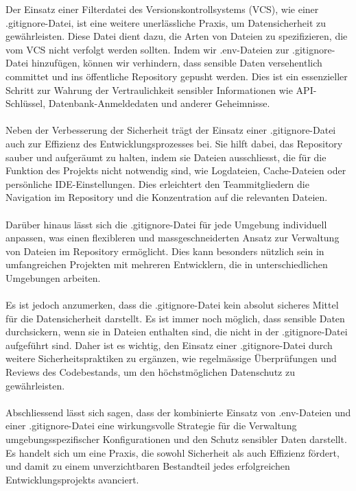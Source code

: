 Der Einsatz einer Filterdatei des Versionskontrollsystems (VCS), wie einer .gitignore-Datei, ist eine weitere unerlässliche Praxis, um Datensicherheit zu gewährleisten. Diese Datei dient dazu, die Arten von Dateien zu spezifizieren, die vom VCS nicht verfolgt werden sollten. Indem wir .env-Dateien zur .gitignore-Datei hinzufügen, können wir verhindern, dass sensible Daten versehentlich committet und ins öffentliche Repository gepusht werden. Dies ist ein essenzieller Schritt zur Wahrung der Vertraulichkeit sensibler Informationen wie API-Schlüssel, Datenbank-Anmeldedaten und anderer Geheimnisse.\\\\
Neben der Verbesserung der Sicherheit trägt der Einsatz einer .gitignore-Datei auch zur Effizienz des Entwicklungsprozesses bei. Sie hilft dabei, das Repository sauber und aufgeräumt zu halten, indem sie Dateien ausschliesst, die für die Funktion des Projekts nicht notwendig sind, wie Logdateien, Cache-Dateien oder persönliche IDE-Einstellungen. Dies erleichtert den Teammitgliedern die Navigation im Repository und die Konzentration auf die relevanten Dateien.\\\\
Darüber hinaus lässt sich die .gitignore-Datei für jede Umgebung individuell anpassen, was einen flexibleren und massgeschneiderten Ansatz zur Verwaltung von Dateien im Repository ermöglicht. Dies kann besonders nützlich sein in umfangreichen Projekten mit mehreren Entwicklern, die in unterschiedlichen Umgebungen arbeiten.\\\\
Es ist jedoch anzumerken, dass die .gitignore-Datei kein absolut sicheres Mittel für die Datensicherheit darstellt. Es ist immer noch möglich, dass sensible Daten durchsickern, wenn sie in Dateien enthalten sind, die nicht in der .gitignore-Datei aufgeführt sind. Daher ist es wichtig, den Einsatz einer .gitignore-Datei durch weitere Sicherheitspraktiken zu ergänzen, wie regelmässige Überprüfungen und Reviews des Codebestands, um den höchstmöglichen Datenschutz zu gewährleisten.\\\\
Abschliessend lässt sich sagen, dass der kombinierte Einsatz von .env-Dateien und einer .gitignore-Datei eine wirkungsvolle Strategie für die Verwaltung umgebungsspezifischer Konfigurationen und den Schutz sensibler Daten darstellt. Es handelt sich um eine Praxis, die sowohl Sicherheit als auch Effizienz fördert, und damit zu einem unverzichtbaren Bestandteil jedes erfolgreichen Entwicklungsprojekts avanciert.
